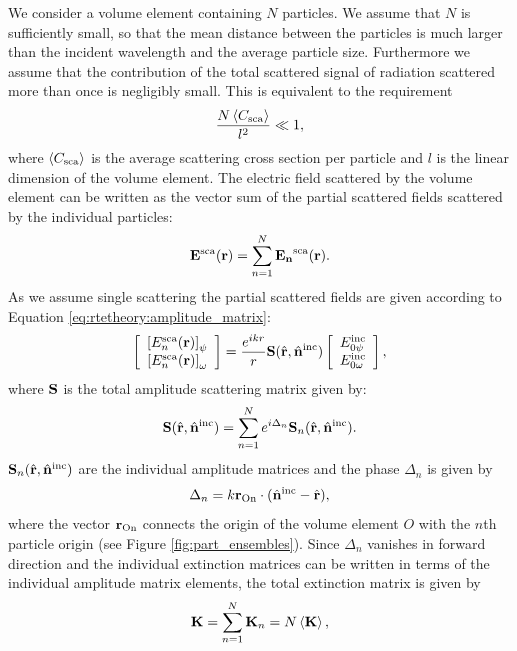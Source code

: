 We consider a volume element containing $N$ particles. We assume that
$N$ is sufficiently small, so that the mean distance between the
particles is much larger than the incident wavelength and the average
particle size. Furthermore we assume that the contribution of the
total scattered signal of radiation scattered more than once is
negligibly small.  This is equivalent to the requirement
\begin{equation}
  \frac{N\left\langle C_{\mathrm{sca}} \right\rangle}{l^2} \ll 1,
\end{equation}
where $\left\langle C_{\mathrm{sca}} \right\rangle$ is the average scattering cross section per
particle and $l$ is the linear dimension of the volume element.  The
electric field scattered by the volume element can be written as the
vector sum of the partial scattered fields scattered by the individual
particles:
\begin{equation}
  \mathbf{E}^{\mathrm{sca}}(\mathbf{r}) = \sum_{n=1}^{N}\mathbf{E_n}^{\mathrm{sca}}(\mathbf{r}).
\end{equation}
As we assume single scattering the partial scattered fields are given
according to Equation \ref{eq:rtetheory:amplitude_matrix}:
\begin{equation}
  \ColVctTwo{\left[ E_n^{\sca}(\VctStl{r}) \right]_\ZntAng}%
         {\left[ E_n^{\sca}(\VctStl{r})\right]_\AzmAng}
         = \frac{e^{ikr}}{r}{\MtrStl{S}(\hat{\VctStl{r}},\hat{\VctStl{n}}^{\inc})} 
 \ColVctTwo{E_{0\ZntAng}^{\inc}}%
         {E_{0\AzmAng}^{\inc}},
\end{equation}
where $\mathbf{S}$ is the total amplitude scattering matrix given by:
\begin{equation}
  \mathbf{S}(\hat{\mathbf{r}},\hat{\mathbf{n}}^{\mathrm{inc}}) = \sum_{n=1}^N e^{i\Delta_n}  {\mathbf{S}_n(\hat{\mathbf{r}},\hat{\mathbf{n}}^{\mathrm{inc}})}.
\end{equation}
$\mathbf{S}_n(\hat{\mathbf{r}},\hat{\mathbf{n}}^{\mathrm{inc}})$ are the individual amplitude
matrices and the phase $\Delta_n$ is given by
\begin{equation}
  \Delta_n = k \mathbf{r}_\mathrm{On} \cdot(\hat{\mathbf{n}}^{\mathrm{inc}} - \hat{\mathbf{r}}),
\end{equation}
where the vector $\mathbf{r}_\mathrm{On}$ connects the origin of the volume
element $O$ with the $n$th particle origin (see
Figure \ref{fig:part_ensembles}).  Since $\Delta_n$ vanishes in forward
direction and the individual extinction matrices can be written in
terms of the individual amplitude matrix elements, the total
extinction matrix is given by
\begin{equation}
  \label{eq:rtetheory:ext_mat_tot}
  {\bf K} = \sum_{n=1}^N  \mathbf{K}_n = N \left\langle {\bf K} \right\rangle,
\end{equation}
